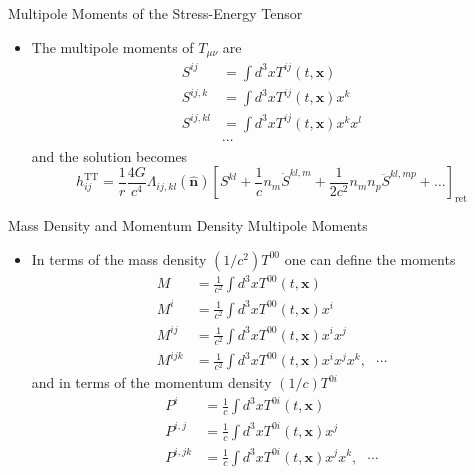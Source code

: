 \documentclass[size=11pt,style=paintings]{powerdot}
\begin{document}
\begin{slide}{Multipole Moments of the Stress-Energy Tensor}
 \begin{itemize}
 \item The multipole moments of $T_{\mu\nu}$ are
 $$
\begin{aligned} S^{i j} &=\int d^{3} x T^{i j}(t, \mathbf{x}) \\ S^{i j, k} &=\int d^{3} x T^{i j}(t, \mathbf{x}) x^{k} \\ S^{i j, k l} &=\int d^{3} x T^{i j}(t, \mathbf{x}) x^{k} x^{l} \\ & \cdots \end{aligned}
$$
and the solution becomes
$$
h_{i j}^{\mathrm{TT}}=\frac{1}{r} \frac{4 G}{c^{4}} \Lambda_{i j, k l}(\hat{\mathbf{n}})\left[S^{k l}+\frac{1}{c} n_{m} \dot{S}^{k l, m}+\frac{1}{2 c^{2}} n_{m} n_{p} \ddot{S}^{k l, m p}+\ldots\right]_{\mathrm{ret}}
$$
 \end{itemize}
 \end{slide}


\begin{slide}{Mass Density and Momentum Density Multipole Moments}
 \begin{itemize}
 \item In terms of the mass density $ \left(1 / c^{2}\right) T^{00} $ one can define the moments
 $$
\begin{aligned} M &=\frac{1}{c^{2}} \int d^{3} x T^{00}(t, \mathbf{x}) \\ M^{i} &=\frac{1}{c^{2}} \int d^{3} x T^{00}(t, \mathbf{x}) x^{i} \\ M^{i j} &=\frac{1}{c^{2}} \int d^{3} x T^{00}(t, \mathbf{x}) x^{i} x^{j} \\ M^{i j k} &=\frac{1}{c^{2}} \int d^{3} x T^{00}(t, \mathbf{x}) x^{i} x^{j} x^{k},  \ \ \
 \cdots  \end{aligned}
$$
and in terms of the momentum density  $(1/c) T^{0 i}$$$
\begin{aligned} P^{i} &=\frac{1}{c} \int d^{3} x T^{0 i}(t, \mathbf{x}) \\ P^{i, j} &=\frac{1}{c} \int d^{3} x T^{0 i}(t, \mathbf{x}) x^{j} \\ P^{i, j k} &=\frac{1}{c} \int d^{3} x T^{0 i}(t, \mathbf{x}) x^{j} x^{k}, \ \ \  \cdots \end{aligned}
$$
 \end{itemize}
 \end{slide}
\end{document}
